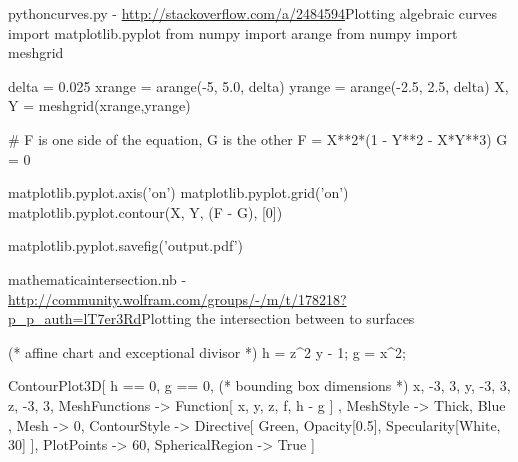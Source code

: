 \documentclass{article}
\begin{document}
    \begin{TMcode}{python}{curves.py - \url{http://stackoverflow.com/a/2484594}}{Plotting algebraic curves}
    import matplotlib.pyplot
    from numpy import arange
    from numpy import meshgrid

    delta = 0.025
    xrange = arange(-5, 5.0, delta)
    yrange = arange(-2.5, 2.5, delta)
    X, Y = meshgrid(xrange,yrange)

    # F is one side of the equation, G is the other
    F = X**2*(1 - Y**2 - X*Y**3)
    G = 0

    matplotlib.pyplot.axis('on')
    matplotlib.pyplot.grid('on')
    matplotlib.pyplot.contour(X, Y, (F - G), [0])

    matplotlib.pyplot.savefig('output.pdf')
    \end{TMcode}

    \clearpage
    \begin{TMcode}{mathematica}{intersection.nb - \url{http://community.wolfram.com/groups/-/m/t/178218?p_p_auth=lT7er3Rd}}{Plotting the intersection between to surfaces}

    (* affine chart and exceptional divisor *)
    h = z^2 y - 1;
    g = x^2;

    ContourPlot3D[
        {h == 0, g == 0}, 
        (* bounding box dimensions *)
        {x, -3, 3}, 
        {y, -3, 3}, 
        {z, -3, 3}, 
        MeshFunctions -> {
            Function[ {x, y, z, f}, h - g ]
        }, 
        MeshStyle -> {
            { Thick, Blue }
        }, 
        Mesh -> {{0}}, 
        ContourStyle -> Directive[
                Green, Opacity[0.5], Specularity[White, 30]
        ], 
        PlotPoints -> 60,
        SphericalRegion -> True
    ]
    \end{TMcode}

    \printbibliography 
\end{document}
